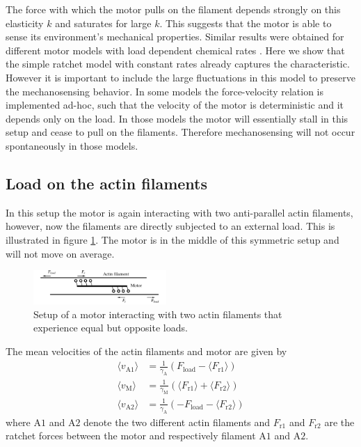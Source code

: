 \documentclass[aps,pre,twocolumn,showpacs,showkeys]{revtex4-1}
\begin{document}
The force with which the motor pulls on the filament depends strongly on this elasticity $k$ and saturates for large $k$. 
This suggests that the motor is able to sense its environment's mechanical properties.
Similar results were obtained for different motor models with load dependent chemical rates \cite{stam2015isoforms,albert2014stochastic}.
Here we show that the simple ratchet model with constant rates already captures the characteristic. However it is important to include the large fluctuations in this model to preserve the mechanosensing behavior. In some models the force-velocity relation is implemented ad-hoc, such that the velocity of the motor is deterministic and it depends only on the load. In those models the motor will essentially stall in this setup and 
cease to pull on the filaments. Therefore mechanosensing will not occur spontaneously in those models.


\subsection{Load on the actin filaments}

In this setup the motor is again interacting with two anti-parallel actin filaments, however, now the filaments are directly subjected to an external load.
This is illustrated in figure \ref{Fig: tug_F_illustration}. 
The motor is in the middle of this symmetric setup and will not move on average. 

\begin{figure}[b]
\centering
\includegraphics[width=0.45\textwidth,height=!]{tug_F_illustration}
\caption{Setup of a motor interacting with two actin filaments that experience equal but opposite loads.}
\label{Fig: tug_F_illustration}
\end{figure}

The mean velocities of the actin filaments and motor are given by
\begin{align*}
\langle v_\text{A1} \rangle &= \frac{1}{\gamma_\text{A} } \left( F_\text{load} - \langle F_\text{r1} \rangle \right) \\
\langle v_\text{M} \rangle &= \frac{1}{\gamma_\text{M} } \left( \langle F_\text{r1} \rangle + \langle F_\text{r2} \rangle \right)\\
\langle v_\text{A2} \rangle &= \frac{1}{ \gamma_\text{A} } \left( - F_\text{load} - \langle F_\text{r2} \rangle \right) 
\end{align*}
where $\text{A1}$ and $\text{A2}$ denote the two different actin filaments and $F_\text{r1}$ and $F_\text{r2}$ are the ratchet forces between the motor and respectively filament $\text{A1}$ and $\text{A2}$. 
\end{document}
